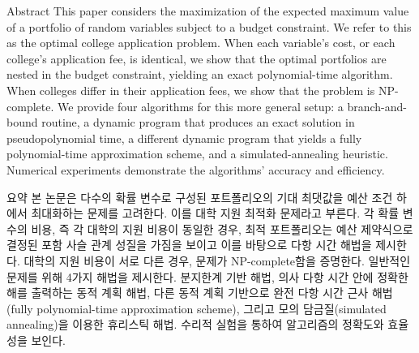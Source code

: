 \documentclass[10pt,slidestop,compress,mathserif,notheorems]{beamer}
\newif\ifen
\theoremstyle{definition}
\theoremstyle{definition}
\begin{document}
\begin{frame}{Abstract}
This paper considers the maximization of the expected maximum value of a portfolio of random variables subject to a budget constraint. We refer to this as the optimal college application problem. When each variable's cost, or each college's application fee, is identical, we show that the optimal portfolios are nested in the budget constraint, yielding an exact polynomial-time algorithm. When colleges differ in their application fees, we show that the problem is NP-complete. We provide four algorithms for this more general setup: a branch-and-bound routine, a dynamic program that produces an exact solution in pseudopolynomial time, a different dynamic program that yields a fully polynomial-time approximation scheme, and a simulated-annealing heuristic. Numerical experiments demonstrate the algorithms' accuracy and efficiency. 
\end{frame}




\ifen \else
\begin{frame}{요약}
본 논문은 다수의 확률 변수로 구성된 포트폴리오의 기대 최댓값을 예산 조건 하에서 최대화하는 문제를 고려한다. 이를 대학 지원 최적화 문제라고 부른다. 각 확률 변수의 비용, 즉 각 대학의 지원 비용이 동일한 경우, 최적 포트폴리오는 예산 제약식으로 결정된 포함 사슬 관계 성질을 가짐을 보이고 이를 바탕으로 다항 시간 해법을 제시한다. 대학의 지원 비용이 서로 다른 경우, 문제가 NP-complete함을 증명한다. 일반적인 문제를 위해 4가지 해법을 제시한다. 분지한계 기반 해법, 의사 다항 시간 안에 정확한 해를 출력하는 동적 계획 해법, 다른 동적 계획 기반으로 완전 다항 시간 근사 해법(fully polynomial-time approximation scheme), 그리고 모의 담금질(simulated annealing)을 이용한 휴리스틱 해법. 
수리적 실험을 통하여 알고리즘의 정확도와 효율성을 보인다.
\end{frame}

\fi
\end{document}
